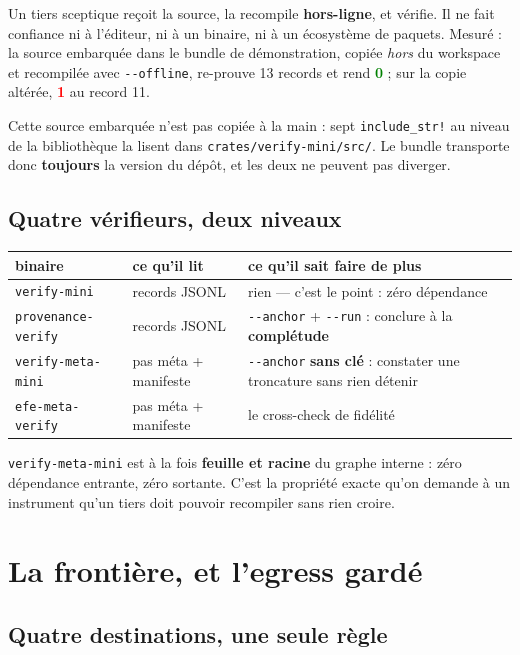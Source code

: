 \documentclass[10pt]{report}
\newcommand{\code}[1]{\texttt{\small #1}}
\newcommand{\ok}[1]{\textcolor{green}{\textbf{#1}}}
\newcommand{\ko}[1]{\textcolor{red}{\textbf{#1}}}
\begin{document}
\begin{acquis}
Un tiers sceptique reçoit la source, la recompile \textbf{hors-ligne}, et vérifie. Il ne fait
confiance ni à l'éditeur, ni à un binaire, ni à un écosystème de paquets. Mesuré : la source
embarquée dans le bundle de démonstration, copiée \emph{hors} du workspace et recompilée avec
\code{-{}-offline}, re-prouve 13 records et rend \ok{0} ; sur la copie altérée, \ko{1} au record 11.
\end{acquis}

Cette source embarquée n'est pas copiée à la main : sept \code{include\_str!} au niveau de la
bibliothèque la lisent dans \code{crates/verify-mini/src/}. Le bundle transporte donc
\textbf{toujours} la version du dépôt, et les deux ne peuvent pas diverger.

\subsection{Quatre vérifieurs, deux niveaux}

\begin{longtable}{@{}p{4.0cm} p{3.8cm} p{7.2cm}@{}}
\toprule \textbf{binaire} & \textbf{ce qu'il lit} & \textbf{ce qu'il sait faire de plus} \\ \midrule \endhead
\code{verify-mini} & records JSONL & rien --- c'est le point : zéro dépendance \\
\code{provenance-verify} & records JSONL & \code{-{}-anchor} + \code{-{}-run} : conclure à la \textbf{complétude} \\
\code{verify-meta-mini} & pas méta + manifeste & \code{-{}-anchor} \textbf{sans clé} : constater une troncature sans rien détenir \\
\code{efe-meta-verify} & pas méta + manifeste & le cross-check de fidélité \\
\bottomrule
\end{longtable}

\code{verify-meta-mini} est à la fois \textbf{feuille et racine} du graphe interne : zéro dépendance
entrante, zéro sortante. C'est la propriété exacte qu'on demande à un instrument qu'un tiers doit
pouvoir recompiler sans rien croire.

\section{La frontière, et l'egress gardé}

\subsection{Quatre destinations, une seule règle}
\end{document}
